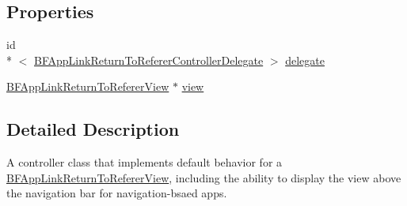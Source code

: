\subsection*{Properties}
\begin{DoxyCompactItemize}
\item 
id\\*
$<$ \hyperlink{protocol_b_f_app_link_return_to_referer_controller_delegate-p}{B\-F\-App\-Link\-Return\-To\-Referer\-Controller\-Delegate} $>$ \hyperlink{interface_b_f_app_link_return_to_referer_controller_a314cd7219fab9e64981a67e3bf99c6d6}{delegate}
\item 
\hyperlink{interface_b_f_app_link_return_to_referer_view}{B\-F\-App\-Link\-Return\-To\-Referer\-View} $\ast$ \hyperlink{interface_b_f_app_link_return_to_referer_controller_af28b223c0c9a782847fdf45e934a2009}{view}
\end{DoxyCompactItemize}


\subsection{Detailed Description}
A controller class that implements default behavior for a \hyperlink{interface_b_f_app_link_return_to_referer_view}{B\-F\-App\-Link\-Return\-To\-Referer\-View}, including the ability to display the view above the navigation bar for navigation-\/bsaed apps. 

